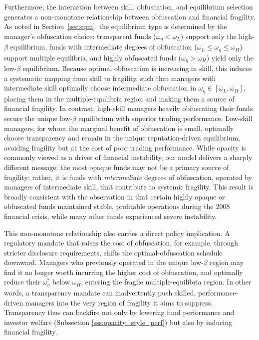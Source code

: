 Furthermore, the interaction between skill, obfuscation, and equilibrium
selection generates a non-monotone relationship between obfuscation and financial
fragility.  As noted in Section~\ref{sec:eqm}, the equilibrium type is
determined by the manager's obfuscation choice: transparent funds
($\omega_{\eta} < \omega_{L}$) support only the high-$\beta$ equilibrium,
funds with intermediate degrees of obfuscation ($\omega_{L} \le \omega_{\eta} \le
\omega_{H}$) support multiple equilibria, and highly obfuscated funds ($\omega_{\eta} >
\omega_{H}$) yield only the low-$\beta$ equilibrium.  Because optimal obfuscation
is increasing in skill, this induces a systematic mapping from skill to
fragility, such that managers with intermediate skill optimally choose intermediate obfuscation in $\omega_{\eta}\in[\omega_{L}, \omega_{H}]$, placing them in the multiple-equilibria region and making them a source of financial fragility.  In contrast, high-skill
managers heavily obfuscating their funds secure the unique low-$\beta$ equilibrium with superior trading performance. Low-skill managers, for whom the marginal benefit of obfuscation is small, optimally choose transparency and remain in the unique reputation-driven equilibrium, avoiding fragility but at the cost of poor trading performance. While opacity is commonly viewed as a driver of financial instability, our model delivers a sharply different message: the most opaque funds may not be a primary source of fragility; rather, it is funds with \emph{intermediate} degrees of obfuscation, operated by managers of intermediate skill, that contribute to
systemic fragility. This result is broadly consistent with the observation in \citet{zuckerman2019} that certain highly opaque or obfuscated funds maintained stable, profitable operations during the 2008 financial crisis, while many 
other funds experienced severe instability.

This non-monotone relationship also carries a direct policy implication.  A regulatory mandate that raises the cost of obfuscation, for example, through
stricter disclosure requirements, shifts the optimal-obfuscation schedule
downward.  Managers who previously operated in the unique low-$\beta$ region
may find it no longer worth incurring the higher cost of obfuscation, and
optimally reduce their $\omega_{\eta}^{*}$ below $\omega_{H}$, entering the
fragile multiple-equilibria region.  In other words, a transparency mandate
can inadvertently push skilled, performance-driven managers into the very
region of fragility it aims to suppress. Transparency thus can backfire not only by lowering fund performance and investor welfare (Subsection \ref{sss:opacity_style_perf}) but also by inducing financial fragility.

